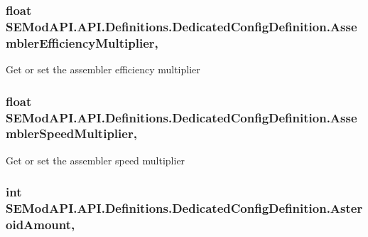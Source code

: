 \subsubsection[{Assembler\+Efficiency\+Multiplier}]{\setlength{\rightskip}{0pt plus 5cm}float S\+E\+Mod\+A\+P\+I.\+A\+P\+I.\+Definitions.\+Dedicated\+Config\+Definition.\+Assembler\+Efficiency\+Multiplier\hspace{0.3cm}{\ttfamily [get]}, {\ttfamily [set]}}\label{class_s_e_mod_a_p_i_1_1_a_p_i_1_1_definitions_1_1_dedicated_config_definition_a3536b5c5146e9c0a8e576e2534248f05}


Get or set the assembler efficiency multiplier 

\hypertarget{class_s_e_mod_a_p_i_1_1_a_p_i_1_1_definitions_1_1_dedicated_config_definition_a0346c85cc9576e12ccdb3f9f73db01c3}{}
\subsubsection[{Assembler\+Speed\+Multiplier}]{\setlength{\rightskip}{0pt plus 5cm}float S\+E\+Mod\+A\+P\+I.\+A\+P\+I.\+Definitions.\+Dedicated\+Config\+Definition.\+Assembler\+Speed\+Multiplier\hspace{0.3cm}{\ttfamily [get]}, {\ttfamily [set]}}\label{class_s_e_mod_a_p_i_1_1_a_p_i_1_1_definitions_1_1_dedicated_config_definition_a0346c85cc9576e12ccdb3f9f73db01c3}


Get or set the assembler speed multiplier 

\hypertarget{class_s_e_mod_a_p_i_1_1_a_p_i_1_1_definitions_1_1_dedicated_config_definition_a435301f8c4bb00cd091f684943c89752}{}
\subsubsection[{Asteroid\+Amount}]{\setlength{\rightskip}{0pt plus 5cm}int S\+E\+Mod\+A\+P\+I.\+A\+P\+I.\+Definitions.\+Dedicated\+Config\+Definition.\+Asteroid\+Amount\hspace{0.3cm}{\ttfamily [get]}, {\ttfamily [set]}}\label{class_s_e_mod_a_p_i_1_1_a_p_i_1_1_definitions_1_1_dedicated_config_definition_a435301f8c4bb00cd091f684943c89752}


